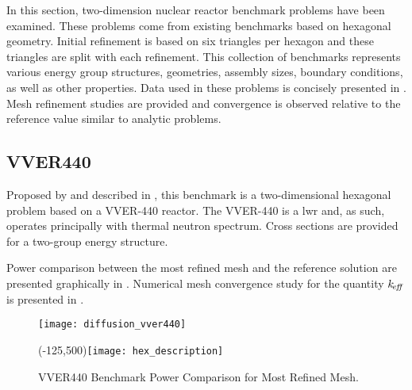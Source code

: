   In this section, two-dimension nuclear reactor benchmark
  problems have been examined.  These problems come from existing benchmarks
  based on hexagonal geometry. Initial refinement is based on six triangles per
  hexagon and these triangles are split with each refinement. This collection of
  benchmarks represents various energy group structures, geometries, assembly
  sizes, boundary conditions, as well as other properties. Data used in these
  problems is concisely presented in . Mesh refinement
  studies are provided and convergence is observed relative to the reference
  \keff value similar to analytic problems. 
  
  \subsection{VVER440}
    Proposed by \textcite{chao} and described in
    , this benchmark is a two-dimensional hexagonal problem
    based on a VVER-440 reactor. The VVER-440 is a \gls{lwr} and, as such, 
    operates principally with thermal neutron spectrum. Cross sections are
    provided for a two-group energy structure.
    
    Power comparison between the most refined mesh and the reference solution
    are presented graphically in . Numerical mesh
    convergence study for the quantity $k_{\!\mbox{\scriptsize \em eff}}$ is presented in
    .

    \begin{figure}
      \centering
      \texttt{[image: diffusion\_vver440]}
      \caption{VVER440 Benchmark Power Comparison for Most Refined Mesh.}
      \label{fig:diffusion_vver440}
      \Put(-125,500){\texttt{[image: hex\_description]}}
    \end{figure}

